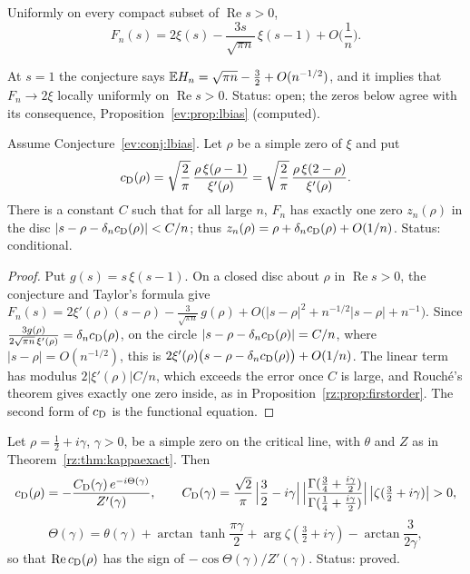 \begin{conjecture}\label{ev:conj:lbias}
Uniformly on every compact subset of $\operatorname{Re}s>0$,
\[
F_n(s)=2\xi(s)-\frac{3s}{\sqrt{\pi n}}\,\xi(s-1)+O\Big(\frac1n\Big).
\]
\end{conjecture}

At $s=1$ the conjecture says $\mathbb{E} H_n=\sqrt{\pi n}-\frac32+O(n^{-1/2})$, and it implies that $F_n\to2\xi$ locally uniformly on $\operatorname{Re}s>0$. Status: open; the zeros below agree with its consequence, Proposition~\ref{ev:prop:lbias} (computed).

\begin{proposition}\label{ev:prop:lbias}
Assume Conjecture~\ref{ev:conj:lbias}. Let $\rho$ be a simple zero of $\xi$ and put
\[
c_{\rm D}(\rho)=\sqrt{\frac2\pi}\,\frac{\rho\,\xi(\rho-1)}{\xi'(\rho)}=\sqrt{\frac2\pi}\,\frac{\rho\,\xi(2-\rho)}{\xi'(\rho)} .
\]
There is a constant $C$ such that for all large $n$, $F_n$ has exactly one zero $z_n(\rho)$ in the disc $|s-\rho-\delta_nc_{\rm D}(\rho)|<C/n$; thus $z_n(\rho)=\rho+\delta_nc_{\rm D}(\rho)+O(1/n)$. Status: conditional.
\end{proposition}

\begin{proof}
Put $g(s)=s\,\xi(s-1)$. On a closed disc about $\rho$ in $\operatorname{Re}s>0$, the conjecture and Taylor's formula give $F_n(s)=2\xi'(\rho)(s-\rho)-\frac3{\sqrt{\pi n}}\,g(\rho)+O\big(|s-\rho|^2+n^{-1/2}|s-\rho|+n^{-1}\big)$. Since $\frac{3g(\rho)}{2\sqrt{\pi n}\,\xi'(\rho)}=\delta_nc_{\rm D}(\rho)$, on the circle $|s-\rho-\delta_nc_{\rm D}(\rho)|=C/n$, where $|s-\rho|=O(n^{-1/2})$, this is $2\xi'(\rho)\big(s-\rho-\delta_nc_{\rm D}(\rho)\big)+O(1/n)$. The linear term has modulus $2|\xi'(\rho)|C/n$, which exceeds the error once $C$ is large, and Rouch\'e's theorem gives exactly one zero inside, as in Proposition~\ref{rz:prop:firstorder}. The second form of $c_{\rm D}$ is the functional equation.
\end{proof}

\begin{proposition}\label{ev:prop:lbphase}
Let $\rho=\frac12+i\gamma$, $\gamma>0$, be a simple zero on the critical line, with $\theta$ and $Z$ as in Theorem~\ref{rz:thm:kappaexact}. Then
\[
c_{\rm D}(\rho)=-\frac{C_{\rm D}(\gamma)\,e^{-i\Theta(\gamma)}}{Z'(\gamma)},\qquad C_{\rm D}(\gamma)=\frac{\sqrt2}\pi\,\Big|\frac32-i\gamma\Big|\,\Big|\frac{\Gamma(\frac34+\frac{i\gamma}2)}{\Gamma(\frac14+\frac{i\gamma}2)}\Big|\,\big|\zeta(\tfrac32+i\gamma)\big|>0,
\]
\[
\Theta(\gamma)=\theta(\gamma)+\arctan\tanh\frac{\pi\gamma}2+\arg\zeta(\tfrac32+i\gamma)-\arctan\frac3{2\gamma},
\]
so that $\operatorname{Re}c_{\rm D}(\rho)$ has the sign of $-\cos\Theta(\gamma)/Z'(\gamma)$. Status: proved.
\end{proposition}

